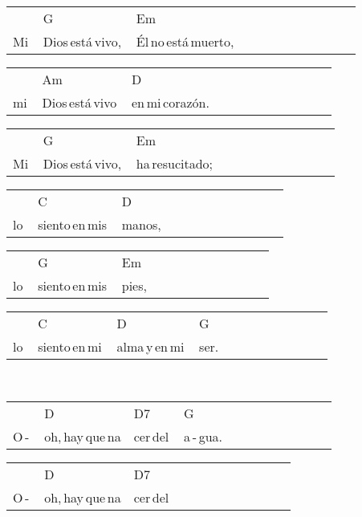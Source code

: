 \hfill
\begin{multicols}{2}
\noindent
\begin{minipage}{\columnwidth}
\noindent
\noindent
\begin{tabular}{llllllllllll}
&G&Em\\
Mi\,&Dios\,está\,vivo,\,&Él\,no\,está\,muerto,
\end{tabular}

\noindent
\begin{tabular}{llllllllllll}
&Am&D\\
mi\,&Dios\,está\,vivo\,&en\,mi\,corazón.
\end{tabular}

\noindent
\begin{tabular}{llllllllllll}
&G&Em\\
Mi\,&Dios\,está\,vivo,\,&ha\,resucitado;
\end{tabular}

\noindent
\begin{tabular}{llllllllllll}
&C&D\\
lo\,&siento\,en\,mis\,&manos,
\end{tabular}

\noindent
\begin{tabular}{llllllllllll}
&G&Em\\
lo\,&siento\,en\,mis\,&pies,
\end{tabular}

\noindent
\begin{tabular}{llllllllllll}
&C&D&G\\
lo\,&siento\,en\,mi\,&alma\,y\,en\,mi\,&ser.
\end{tabular}
\end{minipage}\\

\noindent
\begin{minipage}{\columnwidth}
\noindent
\noindent
\begin{tabular}{llllllllllll}
&D&D7&G\\
O\,-\,&oh,\,hay\,que\,na&cer\,del\,&a\,-\,gua.
\end{tabular}

\noindent
\begin{tabular}{llllllllllll}
&D&D7\\
O\,-\,&oh,\,hay\,que\,na&cer\,del
\end{tabular}


\end{minipage}
\end{multicols}
